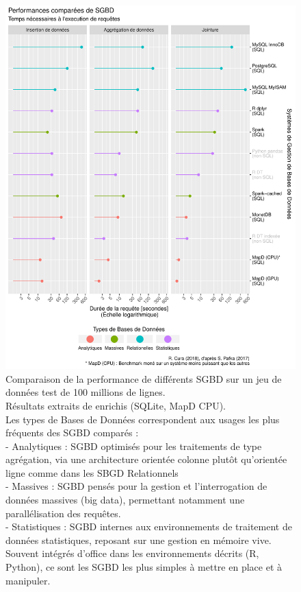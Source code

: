 			\begin{figure}[H]
				\centering
				\includegraphics[width=\linewidth]{img/benchmark_results.pdf}
				\caption[Comparaison de la performance de différents SGBD sur un jeu de donnees test de 100 millions de lignes.]{Comparaison de la performance de différents SGBD sur un jeu de données test de 100 millions de lignes.\\
				Résultats extraits de \autocite{pafka_benchm-databases_2017} enrichis (SQLite, MapD CPU).\\
				Les \og types de Bases de Données\fg{} correspondent aux usages les plus fréquents des SGBD comparés :\\
				- Analytiques : SGBD optimisés pour les traitements de type agrégation, via une architecture orientée colonne plutôt qu'orientée ligne comme dans les SBGD Relationnels\\
				- Massives : SGBD pensés pour la gestion et l'interrogation de données massives (big data), permettant notamment une parallélisation des requêtes.\\
				- Statistiques : SGBD internes aux environnements de traitement de données statistiques, reposant sur une gestion en mémoire vive. Souvent intégrés d'office dans les environnements décrits (R, Python), ce sont les SGBD les plus simples à mettre en place et à manipuler.
			}
				\label{fig:db-benchmarks}
			\end{figure}
			
